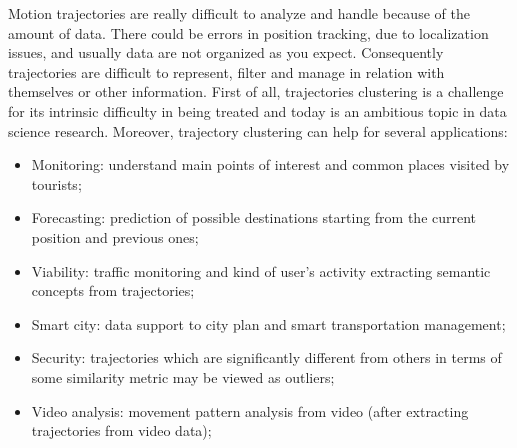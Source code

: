 Motion trajectories are really difficult to analyze and handle because of the amount of data. There could be errors in position tracking, due to localization issues, and usually data are not organized as you expect. Consequently trajectories are difficult to represent, filter and manage in relation with themselves or other information. First of all, trajectories clustering is a challenge for its intrinsic difficulty in being treated and today is an ambitious topic in data science research. Moreover, trajectory clustering can help for several applications:
\begin{itemize}
	\item Monitoring: understand main points of interest and common places visited by tourists;
	\item Forecasting: prediction of possible destinations starting from the current position and previous ones; 
	\item Viability: traffic monitoring and kind of user's activity extracting semantic concepts from trajectories;
	\item Smart city: data support to city plan and smart transportation management;
	\item Security: trajectories which are significantly different from others in terms of some similarity metric may be viewed as outliers;
	\item Video analysis: movement pattern analysis from video (after extracting trajectories from video data);
\end{itemize}

